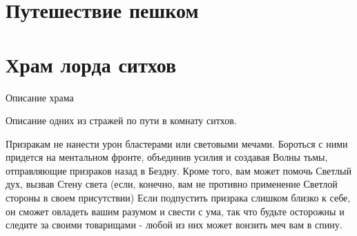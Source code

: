\documentclass{article}
\begin{document}
\section{Путешествие пешком}


\section{Храм лорда ситхов}
Описание храма
\begin{myquote}
\color{sw}

\end{myquote}

Описание одних из стражей по пути в комнату ситхов.
\begin{myquote}
\color{sw}

\end{myquote}
Призракам не нанести урон бластерами или световыми мечами.
Бороться с ними придется на ментальном фронте, объединив усилия и создавая Волны тьмы, отправляющие призраков назад в Бездну.
Кроме того, вам может помочь Светлый дух, вызвав Стену света (если, конечно, вам не противно применение Светлой стороны в своем присутствии)
Если подпустить призрака слишком близко к себе, он сможет овладеть вашим разумом и свести с ума, так что будьте осторожны и следите за своими товарищами - любой из них может вонзить меч вам в спину.
\end{document}
